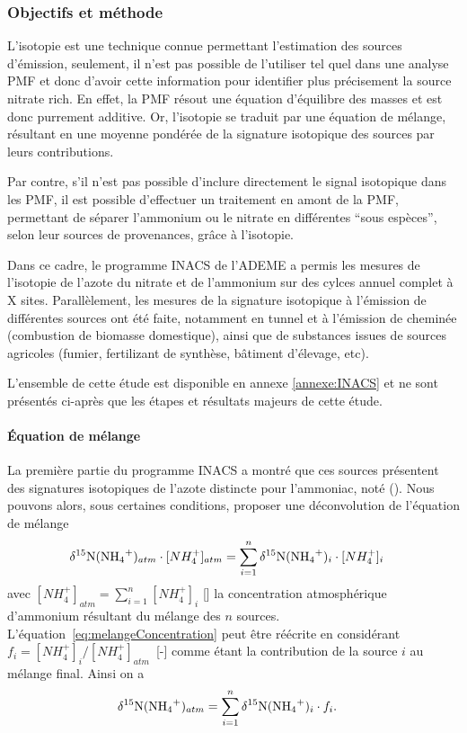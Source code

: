 \subsubsection{Objectifs et méthode}%
\label{ssub:objectif_et_methode}

L'isotopie est une technique connue permettant l'estimation des sources d'émission,
seulement, il n'est pas possible de l'utiliser tel quel dans une analyse PMF et donc
d'avoir cette information pour identifier plus précisement la source nitrate rich.
En effet, la PMF résout une équation d'équilibre des masses et est donc purrement
additive. Or, l'isotopie se traduit par une équation de mélange, résultant en une moyenne
pondérée de la signature isotopique des sources par leurs contributions.

Par contre, s'il n'est pas possible d'inclure directement le signal isotopique dans les
PMF, il est possible d'effectuer un traitement en amont de la PMF, permettant de séparer
l'ammonium ou le nitrate en différentes ``sous espèces'', selon leur sources de
provenances, grâce à l'isotopie.

Dans ce cadre, le programme INACS de l'ADEME a permis les mesures de l'isotopie de l'azote
du nitrate et de l'ammonium sur des cylces annuel complet à X sites.  Parallèlement, les
mesures de la signature isotopique à l'émission de différentes sources ont été faite,
notamment en tunnel et à l'émission de cheminée (combustion de biomasse domestique), ainsi
que de substances issues de sources agricoles (fumier, fertilizant de synthèse, bâtiment
d'élevage, etc).

L'ensemble de cette étude est disponible en annexe \ref{annexe:INACS} et ne sont présentés
ci-après que les étapes et résultats majeurs de cette étude.

\paragraph{Équation de mélange}%
\label{par:équation_de_mélange}

La première partie du programme INACS a montré que ces sources présentent des signatures
isotopiques de l'azote distincte pour l'ammoniac, noté \dN(\NHq).
Nous pouvons alors, sous certaines conditions, proposer une déconvolution de l'équation de mélange
\begin{align}
    \dN(\NHq)_{atm} \cdot [NH_4^+]_{atm} &= \sum_{i=1}^{n} \dN(\NHq)_i \cdot [NH_4^+]_i
    \label{eq:melangeConcentration}
\end{align}
avec $[NH_4^+]_{atm} = \sum_{i=1}^n [NH_4^+]_i$ [\si{\ugm}] la concentration atmosphérique
d'ammonium résultant du mélange des $n$ sources.  L'équation~\ref{eq:melangeConcentration}
peut être réécrite en considérant $f_i = [NH_4^+]_i / [NH_4^+]_{atm}$~[-] comme étant la
contribution de la source $i$ au mélange final. Ainsi on a
\begin{align}
    \dN(\NHq)_{atm} &= \sum_{i=1}^n \dN(\NHq)_i \cdot f_i. 
    \label{eq:melangeContrib}
\end{align}

